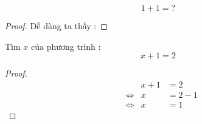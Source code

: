 






\begin{question}{1}
\[1 + 1 = ?\]
\end{question}

\begin{proof}
Dễ dàng ta thấy : 
\end{proof}

\begin{question}{2}
Tìm $x$ của phương trình : \[x + 1 = 2\]
\end{question}

\begin{proof}
\begin{alignat*}{2}
    && x + 1 &= 2 \\
    &\Leftrightarrow& x &= 2 - 1 \\
    &\Leftrightarrow& x &= 1
\end{alignat*}
\end{proof}

